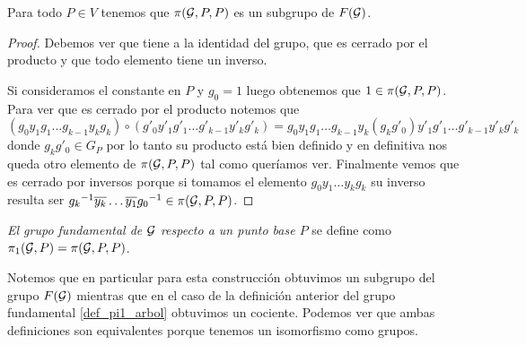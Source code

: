 \documentclass[tesis.tex]{subfiles}
\begin{document}
\begin{prop}
	Para todo $P \in V$ tenemos que $\pi({\cal G},P,P)$ es un subgrupo de $F({\cal G})$.
\end{prop}
\begin{proof}
	Debemos ver que tiene a la identidad del grupo, que es cerrado por el producto y que todo elemento tiene un inverso.

	Si consideramos el constante en $P$ y $g_0 = 1$ luego obtenemos que $1 \in \pi({\cal G}, P , P)$.
	Para ver que es cerrado por el producto notemos que 
	\begin{equation*}
		(g_0y_1g_1 \dots g_{k-1}y_kg_k ) \circ ( g'_0y'_1g'_1 \dots g'_{k-1}y'_kg'_k) =  g_0y_1g_1 \dots g_{k-1}y_k(g_kg'_0)y'_1g'_1 \dots g'_{k-1}y'_kg'_k
	\end{equation*}
	donde $g_kg'_0 \in G_P$ por lo tanto su producto está bien definido y en definitiva nos queda otro elemento de $\pi({\cal G}, P, P)$ tal como queríamos ver.
	Finalmente vemos que es cerrado por inversos porque si tomamos el elemento $g_0y_1\dots y_{k} g_k$ su inverso resulta ser ${g_k}^{-1} \overline{y_k} \dots \overline{y_1}{g_0}^{-1} \in \pi({\cal G},P,P)$.
\end{proof}

\begin{deff}
	\emph{El grupo fundamental de ${\cal G}$ respecto a un punto base $P$} se define como $\pi_1({\cal G}, P) = \pi({\cal G},P,P)$.
\end{deff}

Notemos que en particular para esta construcción obtuvimos un subgrupo del grupo $F(\cal G)$ mientras que en el caso de la definición anterior del grupo fundamental \ref{def_pi1_arbol} obtuvimos un cociente.
Podemos ver que ambas definiciones son equivalentes porque tenemos un isomorfismo como grupos.
\end{document}
